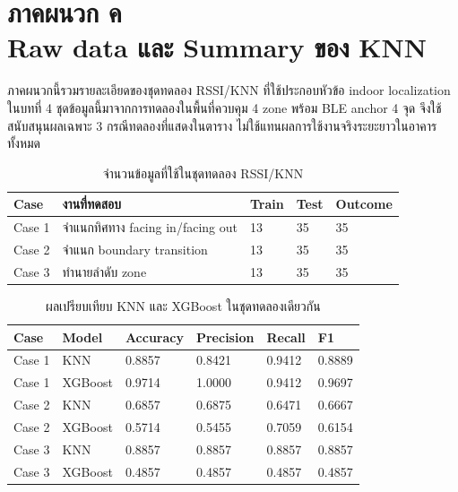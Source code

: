 \chapter[Raw data และ Summary ของ KNN]{\texorpdfstring{ภาคผนวก ค\\Raw data และ Summary ของ KNN}{Appendix C: KNN Raw Data and Summary}}
\label{app:knn_summary}

ภาคผนวกนี้รวมรายละเอียดของชุดทดลอง RSSI/KNN ที่ใช้ประกอบหัวข้อ indoor localization ในบทที่ 4 ชุดข้อมูลนี้มาจากการทดลองในพื้นที่ควบคุม 4 zone พร้อม BLE anchor 4 จุด จึงใช้สนับสนุนผลเฉพาะ 3 กรณีทดลองที่แสดงในตาราง ไม่ใช้แทนผลการใช้งานจริงระยะยาวในอาคารทั้งหมด

\begin{table}[H]
    \centering
    \caption{จำนวนข้อมูลที่ใช้ในชุดทดลอง RSSI/KNN}
    \label{tab:app_knn_case_count}
    \renewcommand{\arraystretch}{1.15}
    \small
    \setlength{\tabcolsep}{3pt}
    \begin{tabular}{|L{0.14\textwidth}|L{0.42\textwidth}|L{0.12\textwidth}|L{0.12\textwidth}|L{0.12\textwidth}|}
        \hline
        \textbf{Case} & \textbf{งานที่ทดสอบ} & \textbf{Train} & \textbf{Test} & \textbf{Outcome} \\ \hline
        Case 1 & จำแนกทิศทาง facing in/facing out & 13 & 35 & 35 \\ \hline
        Case 2 & จำแนก boundary transition & 13 & 35 & 35 \\ \hline
        Case 3 & ทำนายลำดับ zone & 13 & 35 & 35 \\ \hline
    \end{tabular}
\end{table}

\begin{table}[H]
    \centering
    \caption{ผลเปรียบเทียบ KNN และ XGBoost ในชุดทดลองเดียวกัน}
    \label{tab:app_knn_model_compare}
    \renewcommand{\arraystretch}{1.15}
    \small
    \setlength{\tabcolsep}{3pt}
    \begin{tabular}{|L{0.13\textwidth}|L{0.16\textwidth}|L{0.15\textwidth}|L{0.15\textwidth}|L{0.15\textwidth}|L{0.13\textwidth}|}
        \hline
        \textbf{Case} & \textbf{Model} & \textbf{Accuracy} & \textbf{Precision} & \textbf{Recall} & \textbf{F1} \\ \hline
        Case 1 & KNN & 0.8857 & 0.8421 & 0.9412 & 0.8889 \\ \hline
        Case 1 & XGBoost & 0.9714 & 1.0000 & 0.9412 & 0.9697 \\ \hline
        Case 2 & KNN & 0.6857 & 0.6875 & 0.6471 & 0.6667 \\ \hline
        Case 2 & XGBoost & 0.5714 & 0.5455 & 0.7059 & 0.6154 \\ \hline
        Case 3 & KNN & 0.8857 & 0.8857 & 0.8857 & 0.8857 \\ \hline
        Case 3 & XGBoost & 0.4857 & 0.4857 & 0.4857 & 0.4857 \\ \hline
    \end{tabular}
\end{table}

